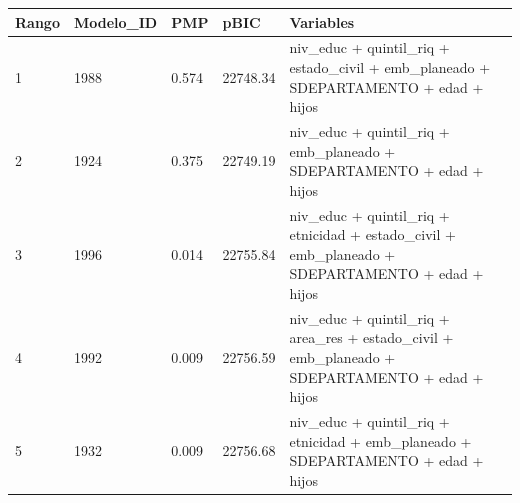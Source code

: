 \begin{tabular}{lllll}
  \toprule
Rango & Modelo\_ID & PMP & pBIC & Variables \\ 
  \midrule
1 & 1988 & 0.574 & 22748.34 & niv\_educ + quintil\_riq + estado\_civil + emb\_planeado + SDEPARTAMENTO + edad + hijos \\ 
  2 & 1924 & 0.375 & 22749.19 & niv\_educ + quintil\_riq + emb\_planeado + SDEPARTAMENTO + edad + hijos \\ 
  3 & 1996 & 0.014 & 22755.84 & niv\_educ + quintil\_riq + etnicidad + estado\_civil + emb\_planeado + SDEPARTAMENTO + edad + hijos \\ 
  4 & 1992 & 0.009 & 22756.59 & niv\_educ + quintil\_riq + area\_res + estado\_civil + emb\_planeado + SDEPARTAMENTO + edad + hijos \\ 
  5 & 1932 & 0.009 & 22756.68 & niv\_educ + quintil\_riq + etnicidad + emb\_planeado + SDEPARTAMENTO + edad + hijos \\ 
   \bottomrule
\end{tabular}
